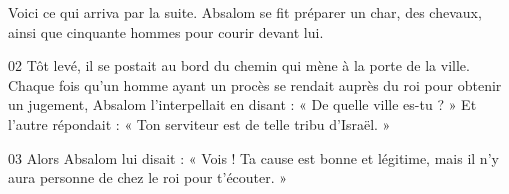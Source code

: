 Voici ce qui arriva par la suite. Absalom se fit préparer un char, des chevaux, ainsi que cinquante hommes pour courir devant lui.

02 Tôt levé, il se postait au bord du chemin qui mène à la porte de la ville. Chaque fois qu’un homme ayant un procès se rendait auprès du roi pour obtenir un jugement, Absalom l’interpellait en disant : « De quelle ville es-tu ? » Et l’autre répondait : « Ton serviteur est de telle tribu d’Israël. »

03 Alors Absalom lui disait : « Vois ! Ta cause est bonne et légitime, mais il n’y aura personne de chez le roi pour t’écouter. »
